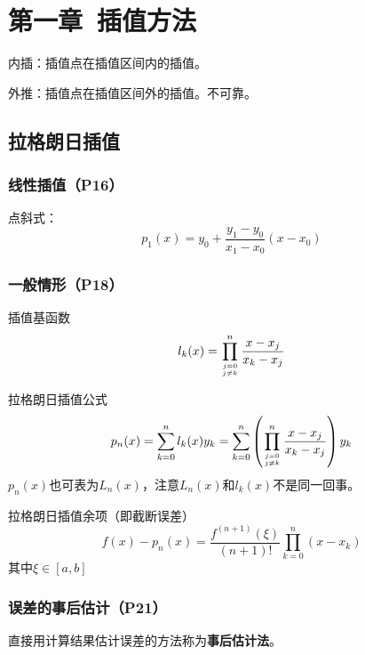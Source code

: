 \documentclass[fontset=ubuntu]{ctexart}
\numberwithin{equation}{section}
\numberwithin{theorem}{section}
\begin{document}

\section{第一章\ 插值方法}
\begin{multicols}{2}

    内插：插值点在插值区间内的插值。

    外推：插值点在插值区间外的插值。不可靠。

    \subsection{拉格朗日插值}

    \subsubsection{线性插值（P16）}

    点斜式：
    \begin{equation}
        p_1(x) = y_0+\frac{y_1-y_0}{x_1-x_0}(x-x_0)
    \end{equation}

    \subsubsection{一般情形（P18）}

    插值基函数
    \begin{equation}
        l_k(x)=\prod_{j=0\atop j\neq k}^{n}\frac{x-x_j}{x_k-x_j}
    \end{equation}

    拉格朗日插值公式
    \begin{equation}
        p_n(x)=\sum_{k=0}^{n}l_k(x)y_k=\sum_{k=0}^{n}\left(\prod_{j=0\atop j\neq k}^{n}\frac{x-x_j}{x_k-x_j} \right )y_k
    \end{equation}
    $p_n(x)$也可表为$L_n(x)$，注意$L_n(x)$和$l_k(x)$不是同一回事。

    拉格朗日插值余项（即截断误差）
    \begin{equation}
        f(x)-p_n(x)=\frac{f^{(n+1)}(\xi)}{(n+1)!}\prod_{k=0}^{n}(x-x_k)
    \end{equation}
    其中$\xi\in[a,b]$

    \subsubsection{误差的事后估计（P21）}

    直接用计算结果估计误差的方法称为\textbf{事后估计法}。


\end{multicols}
\end{document}
